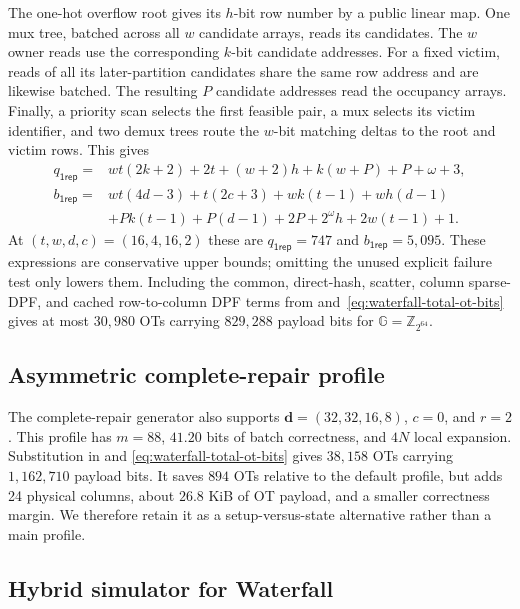 The one-hot overflow root gives its $h$-bit row number by a public linear map.
One mux tree, batched across all $w$ candidate arrays, reads its candidates.
The $w$ owner reads use the corresponding $k$-bit candidate addresses.  For a
fixed victim, reads of all its later-partition candidates share the same row
address and are likewise batched.  The resulting $P$ candidate addresses read
the occupancy arrays.  Finally, a priority scan selects the first feasible
pair, a mux selects its victim identifier, and two demux trees route the
$w$-bit matching deltas to the root and victim rows.  This gives
\begin{align}
 q_{\mathsf{1rep}}
  ={}&wt(2k+2)+2t+(w+2)h+k(w+P)+P+\omega+3,
  \label{eq:waterfall-one-repair-ot-count}\\
 b_{\mathsf{1rep}}
  ={}&wt(4d-3)+t(2c+3)+wk(t-1)+wh(d-1)\nonumber\\
    &+Pk(t-1)+P(d-1)+2P+2^\omega h+2w(t-1)+1.
  \label{eq:waterfall-one-repair-ot-bits}
\end{align}
At $(t,w,d,c)=(16,4,16,2)$ these are
$q_{\mathsf{1rep}}=747$ and $b_{\mathsf{1rep}}=5{,}095$.
These expressions are conservative upper bounds; omitting the unused explicit
failure test only lowers them.  Including the common, direct-hash, scatter,
column sparse-DPF, and cached row-to-column DPF terms from
and~\eqref{eq:waterfall-total-ot-bits} gives at most $30{,}980$ OTs carrying
$829{,}288$ payload bits for $\mathbb G=\mathbb Z_{2^{64}}$.

\subsection{Asymmetric complete-repair profile}

The complete-repair generator also supports
$\mathbf d=(32,32,16,8)$, $c=0$, and $r=2$.  This profile has $m=88$,
$41.20$ bits of batch correctness, and $4N$ local expansion.  Substitution in
 and
\eqref{eq:waterfall-total-ot-bits} gives $38{,}158$ OTs carrying $1{,}162{,}710$
payload bits. It saves $894$ OTs relative to the default profile, but adds
24 physical columns, about $26.8$ KiB of OT payload, and a smaller correctness
margin.  We therefore retain it as a setup-versus-state alternative rather
than a main profile.

\subsection{Hybrid simulator for Waterfall}
\label{app:waterfall-simulator}

